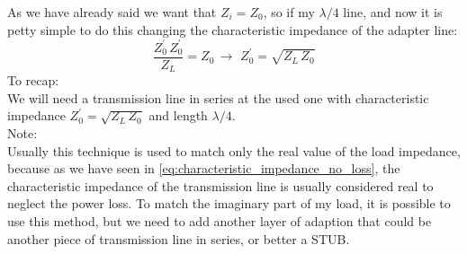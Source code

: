 As we have already said we want that $Z_i=Z_0$, so if my $\lambda/4$ line, and now it is petty simple to do this changing the characteristic impedance of the adapter line:
\begin{equation}
    \frac{Z_0^\prime\,Z_0^\prime}{Z_L}=Z_0\,\rightarrow\,\,Z_0^\prime=\sqrt{Z_L\,Z_0}
\end{equation}
To recap:\\
We will need a transmission line in series at the used one with characteristic impedance $Z_0^\prime=\sqrt{Z_L\,Z_0}$ and length $\lambda/4$.\\
Note:\\
Usually this technique is used to match only the real value of the load impedance, because as we have seen in \cref{eq:characteristic_impedance_no_loss}, the characteristic impedance of the transmission line is usually considered real to neglect the power loss. To match the imaginary part of my load, it is possible to use this method, but we need to add another layer of adaption that could be another piece of transmission line in series, or better a STUB.

